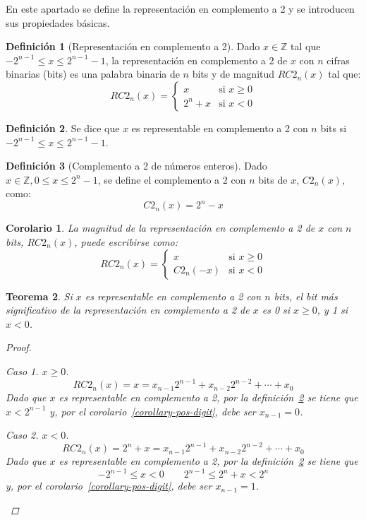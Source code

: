 \documentclass[spanish,a4paper,12pt,titlepage]{article}
\newtheorem{theorem}{Teorema}%
\newtheorem{corollary}[theorem]{Corolario}
\theoremstyle{definition}
\newtheorem{definition}{Definición}%
\theoremstyle{remark}
\newtheorem{case}{Caso}
\newcommand{\bbZ}{\mathbb{Z}}
\begin{document}
En este apartado se define la representación en complemento a 2 y se introducen sus propiedades básicas.

\begin{definition}[Representación en complemento a 2]\label{def-rep-ca2}
  Dado $x \in \bbZ$ tal que $-2^{n-1} \le x \le 2^{n-1}-1$, la representación en complemento a 2 de $x$ con $n$ cifras binarias (bits) es una palabra binaria de $n$ bits y de magnitud $RC2_n(x)$ tal que:
  \[
    RC2_n(x) =
      \begin{cases}
        x     & \text{si } x \ge 0\\
        2^n+x & \text{si } x < 0
      \end{cases}
  \]
\end{definition}

\begin{definition}\label{def-rep-ca2_rep}
  Se dice que $x$ es representable en complemento a 2 con $n$ bits si $-2^{n-1} \le x \le 2^{n-1}-1$.
\end{definition}

\begin{definition}[Complemento a 2 de números enteros]
  Dado $x \in \bbZ, 0 \le x \le 2^n-1$, se define el complemento a 2 con $n$ bits de $x$, $C2_n(x)$, como:
  \[
    C2_n(x) = 2^n - x
  \]
\end{definition}

\begin{corollary}
  La magnitud de la representación en complemento a 2 de $x$ con $n$ bits, $RC2_n(x)$, puede escribirse como:
  \[
    RC2_n(x) = \begin{cases}
      x        & \text{si } x \ge 0\\
      C2_n(-x) & \text{si } x < 0
    \end{cases}
  \]
\end{corollary}

\begin{theorem}\label{theorem-sign-bit}
  Si $x$ es representable en complemento a 2 con $n$ bits, el bit más significativo de la representación en complemento a 2 de $x$ es 0 si $x \ge 0$, y 1 si $x < 0$.
  \begin{proof}
    \begin{case}
      $x \ge 0$.
      \[RC2_n(x)= x = x_{n-1}2^{n-1}+x_{n-2}2^{n-2}+\cdots+x_0\]
      Dado que $x$ es representable en complemento a 2, por la definición~\ref{def-rep-ca2_rep} se tiene que $x<2^{n-1}$ y, por el corolario~\ref{corollary-pos-digit}, debe ser $x_{n-1}=0$.
    \end{case}
    \begin{case}
      $x<0$.
      \[
        RC2_n(x)= 2^n+x = x_{n-1}2^{n-1}+x_{n-2}2^{n-2}+\cdots+x_0
      \]
      Dado que $x$ es representable en complemento a 2, por la definición~\ref{def-rep-ca2_rep} se tiene que
      \[
        -2^{n-1} \le x < 0  \qquad 2^{n-1} \le 2^n + x < 2^n
      \]
      y, por el corolario~\ref{corollary-pos-digit}, debe ser $x_{n-1}=1$.
    \end{case}
  \end{proof}
\end{theorem}
\end{document}
